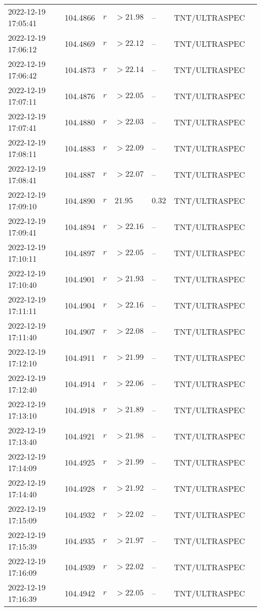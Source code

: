 \documentclass{nature_plusfigure}
\begin{document}
\begin{supplement}
\begin{center}
\begin{longtable}{lllllll}
2022-12-19 17:05:41 & 104.4866 & $r$ & $>21.98$ & -- & TNT/ULTRASPEC &  \\ 
2022-12-19 17:06:12 & 104.4869 & $r$ & $>22.12$ & -- & TNT/ULTRASPEC &  \\ 
2022-12-19 17:06:42 & 104.4873 & $r$ & $>22.14$ & -- & TNT/ULTRASPEC &  \\ 
2022-12-19 17:07:11 & 104.4876 & $r$ & $>22.05$ & -- & TNT/ULTRASPEC &  \\ 
2022-12-19 17:07:41 & 104.4880 & $r$ & $>22.03$ & -- & TNT/ULTRASPEC &  \\ 
2022-12-19 17:08:11 & 104.4883 & $r$ & $>22.09$ & -- & TNT/ULTRASPEC &  \\ 
2022-12-19 17:08:41 & 104.4887 & $r$ & $>22.07$ & -- & TNT/ULTRASPEC &  \\ 
2022-12-19 17:09:10 & 104.4890 & $r$ & $21.95$ & $0.32$ & TNT/ULTRASPEC &  \\ 
2022-12-19 17:09:41 & 104.4894 & $r$ & $>22.16$ & -- & TNT/ULTRASPEC &  \\ 
2022-12-19 17:10:11 & 104.4897 & $r$ & $>22.05$ & -- & TNT/ULTRASPEC &  \\ 
2022-12-19 17:10:40 & 104.4901 & $r$ & $>21.93$ & -- & TNT/ULTRASPEC &  \\ 
2022-12-19 17:11:11 & 104.4904 & $r$ & $>22.16$ & -- & TNT/ULTRASPEC &  \\ 
2022-12-19 17:11:40 & 104.4907 & $r$ & $>22.08$ & -- & TNT/ULTRASPEC &  \\ 
2022-12-19 17:12:10 & 104.4911 & $r$ & $>21.99$ & -- & TNT/ULTRASPEC &  \\ 
2022-12-19 17:12:40 & 104.4914 & $r$ & $>22.06$ & -- & TNT/ULTRASPEC &  \\ 
2022-12-19 17:13:10 & 104.4918 & $r$ & $>21.89$ & -- & TNT/ULTRASPEC &  \\ 
2022-12-19 17:13:40 & 104.4921 & $r$ & $>21.98$ & -- & TNT/ULTRASPEC &  \\ 
2022-12-19 17:14:09 & 104.4925 & $r$ & $>21.99$ & -- & TNT/ULTRASPEC &  \\ 
2022-12-19 17:14:40 & 104.4928 & $r$ & $>21.92$ & -- & TNT/ULTRASPEC &  \\ 
2022-12-19 17:15:09 & 104.4932 & $r$ & $>22.02$ & -- & TNT/ULTRASPEC &  \\ 
2022-12-19 17:15:39 & 104.4935 & $r$ & $>21.97$ & -- & TNT/ULTRASPEC &  \\ 
2022-12-19 17:16:09 & 104.4939 & $r$ & $>22.02$ & -- & TNT/ULTRASPEC &  \\ 
2022-12-19 17:16:39 & 104.4942 & $r$ & $>22.05$ & -- & TNT/ULTRASPEC &  \\ 

\end{longtable}
\end{center}
\end{supplement}
\end{document}
